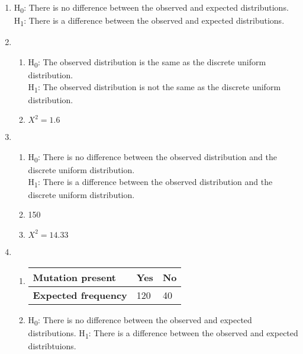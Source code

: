 \documentclass[fleqn]{article}
\begin{document}
\newpage
{}
\begin{enumerate}
    \setlength\itemsep{0.5em}
    \item H\textsubscript{0}: There is no difference between the observed and expected distributions. \\
        H\textsubscript{1}: There is a difference between the observed and expected distributions.
    \item \begin{enumerate}[label=\bfseries \alph*\space ]
            \item H\textsubscript{0}: The observed distribution is the same as the discrete uniform distribution. \\
                H\textsubscript{1}: The observed distribution is not the same as the discrete uniform distribution.
            \item $X^2=1.6$
        \end{enumerate}
    \item \begin{enumerate}[label=\bfseries \alph*\space ]
            \item H\textsubscript{0}: There is no difference between the observed distribution and the discrete uniform distribution. \\
                H\textsubscript{1}: There is a difference between the observed distribution and the discrete uniform distribution.
            \item 150
            \item $X^2=14.33$
        \end{enumerate}
    \item \begin{enumerate}[label=\bfseries \alph*\space ]
            \item \begin{tabularx}{0.4\textwidth}{|X|*2{P{12mm}|}}
                    \hline
                    \textbf{Mutation present}   & Yes  & No  \\\hline
                    \textbf{Expected frequency} & 120  & 40  \\\hline
                \end{tabularx}\vspace{6mm}
            \item H\textsubscript{0}: There is no difference between the observed and expected distributions.
                H\textsubscript{1}: There is a difference between the observed and expected distribtuions.

\end{enumerate}
\end{enumerate}
\end{document}
